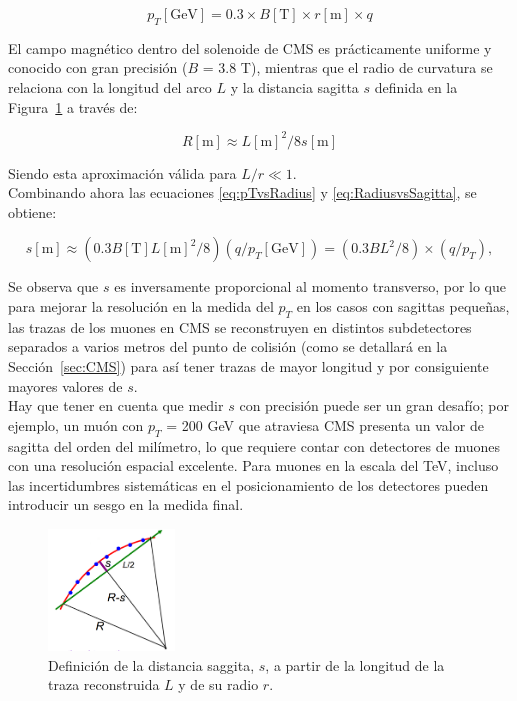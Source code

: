 \begin{equation}
  p_{T}[\text{GeV}] = 0.3 \times B[\text{T}] \times r[\text{m}] \times q
\label{eq:pTvsRadius}
\end{equation}

El campo magn\'etico dentro del solenoide de CMS es pr\'acticamente uniforme y conocido con gran precisi\'on ($B$ = 3.8 T), mientras que el radio de curvatura se relaciona con la longitud del arco $L$ y la distancia sagitta $s$ definida en la Figura~\ref{fig:SagittaDef} a trav\'es de:

\begin{equation}
  R[\text{m}]\approx L[\text{m}]^{2}/8s[\text{m}]
\label{eq:RadiusvsSagitta}
\end{equation}

Siendo esta aproximaci\'on v\'alida para $L/r \ll 1$. \\

Combinando ahora las ecuaciones \eqref{eq:pTvsRadius} y \eqref{eq:RadiusvsSagitta}, se obtiene:

\begin{equation}
  s[\text{m}]\approx (0.3 B [\text{T}] L[\text{m}]^{2}/8) (q/p_{T}[\text{GeV}]) =  (0.3 BL^{2}/8) \times (q/p_{T}),
\label{eq:SagittavsPt}
\end{equation}

Se observa que $s$ es inversamente proporcional al momento transverso, por lo que para mejorar la resoluci\'on en la medida del $p_{T}$ en los casos con sagittas peque\~nas, las trazas de los muones en CMS se reconstruyen en distintos subdetectores separados a varios metros del punto de colisi\'on (como se detallar\'a en la Secci\'on~\ref{sec:CMS}) para as\'i tener trazas de mayor longitud y por consiguiente mayores valores de $s$. \\
Hay que tener en cuenta que medir $s$ con precisi\'on puede ser un gran desaf\'io; por ejemplo, un mu\'on con $p_{T}$ = 200 GeV que atraviesa CMS presenta un valor de sagitta del orden del mil\'imetro, lo que requiere contar con detectores de muones con una resoluci\'on espacial excelente. Para muones en la escala del TeV, incluso las incertidumbres sistem\'aticas en el posicionamiento de los detectores pueden introducir un sesgo en la medida final. \\

\begin{figure}[h]
\centering
\includegraphics[width=0.30\textwidth]{figures/curvaturesketch.png}
\caption{Definici\'on de la distancia saggita, $s$, a partir de la longitud de la traza reconstruida $L$ y de su radio $r$.}
\label{fig:SagittaDef}
\end{figure}

